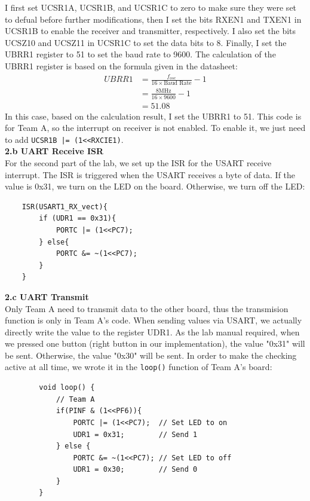\documentclass{report}
\begin{document}
    I first set UCSR1A, UCSR1B, and UCSR1C to zero to make sure they were set to defual before further modifications, then I set the bits RXEN1 and TXEN1 in UCSR1B to enable the receiver and transmitter, respectively. I also set the bits UCSZ10 and UCSZ11 in UCSR1C to set the data bits to 8. Finally, I set the UBRR1 register to 51 to set the baud rate to 9600. The calculation of the UBRR1 register is based on the formula given in the datasheet:
    \begin{align*}
        UBRR1 &= \frac{f_{osc}}{16 \times \text{Baud Rate}} - 1 \\
              &= \frac{8\text{MHz}}{16 \times 9600} - 1 \\
              &= 51.08
    \end{align*}
    In this case, based on the calculation result, I set the UBRR1 to 51. This code is for Team A, so the interrupt on receiver is not enabled. To enable it, we just need to add \texttt{UCSR1B |= (1<<RXCIE1)}.\\[1em]
{\Large \textbf{2.b UART Receive ISR}}\\[0.5em]
    For the second part of the lab, we set up the ISR for the USART receive interrupt. The ISR is triggered when the USART receives a byte of data. If the value is 0x31, we turn on the LED on the board. Otherwise, we turn off the LED:
\begin{verbatim}
    ISR(USART1_RX_vect){
        if (UDR1 == 0x31){
            PORTC |= (1<<PC7);
        } else{
            PORTC &= ~(1<<PC7);
        }
    }
\end{verbatim}
{\Large \textbf{2.c UART Transmit}}\\[0.5em]
    Only Team A need to transmit data to the other board, thus the transmision function is only in Team A's code. When sending values via USART, we actually directly write the value to the register UDR1. As the lab manual required, when we pressed one button (right button in our implementation), the value "0x31" will be sent. Otherwise, the value "0x30" will be sent. In order to make the checking active at all time, we wrote it in the \texttt{loop()} function of Team A's board:
    \begin{verbatim}
        void loop() {
            // Team A
            if(PINF & (1<<PF6)){
                PORTC |= (1<<PC7);  // Set LED to on
                UDR1 = 0x31;        // Send 1
            } else {
                PORTC &= ~(1<<PC7); // Set LED to off
                UDR1 = 0x30;        // Send 0
            }
        } 
    \end{verbatim}
\end{document}
